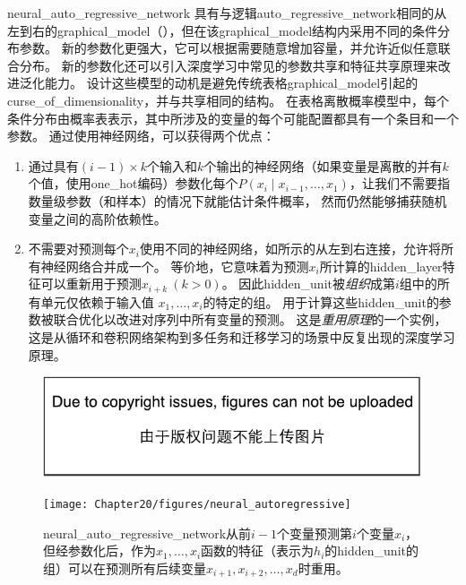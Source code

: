 \gls{neural_auto_regressive_network} \citep{Bengio+Bengio-trnn2000,Bengio+Bengio-NIPS2000}具有与逻辑\gls{auto_regressive_network}相同的从左到右的\gls{graphical_model}（），但在该\gls{graphical_model}结构内采用不同的条件分布参数。
新的参数化更强大，它可以根据需要随意增加容量，并允许近似任意联合分布。
新的参数化还可以引入深度学习中常见的参数共享和特征共享原理来改进泛化能力。
设计这些模型的动机是避免传统表格\gls{graphical_model}引起的\gls{curse_of_dimensionality}，并与共享相同的结构。
在表格离散概率模型中，每个条件分布由概率表表示，其中所涉及的变量的每个可能配置都具有一个条目和一个参数。
通过使用神经网络，可以获得两个优点：
\begin{enumerate}
 \item 通过具有$(i-1) \times k$个输入和$k$个输出的神经网络（如果变量是离散的并有$k$个值，使用\gls{one_hot}编码）参数化每个$P(x_i  \mid  x_{i-1}, \dots, x_1)$，让我们不需要指数量级参数（和样本）的情况下就能估计条件概率， 然而仍然能够捕获随机变量之间的高阶依赖性。

 \item 不需要对预测每个$x_i$使用不同的神经网络，如所示的从左到右连接，允许将所有神经网络合并成一个。
 等价地，它意味着为预测$x_i$所计算的\gls{hidden_layer}特征可以重新用于预测$x_{i+k}~(k > 0)$。
 因此\gls{hidden_unit}被\emph{组织}成第$i$组中的所有单元仅依赖于输入值 $x_1, \dots, x_i$的特定的组。
 用于计算这些\gls{hidden_unit}的参数被联合优化以改进对序列中所有变量的预测。
 这是\emph{重用原理}的一个实例，这是从循环和卷积网络架构到多任务和迁移学习的场景中反复出现的深度学习原理。

\end{enumerate}

\begin{figure}[!htb]
\ifOpenSource
\centerline{\includegraphics{figure.pdf}}
\else
\centerline{\texttt{[image: Chapter20/figures/neural\_autoregressive]}}
\fi
\caption{\gls{neural_auto_regressive_network}从前$i-1$个变量预测第$i$个变量$x_i$，但经参数化后，作为$x_1,\dots,x_i$函数的特征（表示为$h_i$的\gls{hidden_unit}的组）可以在预测所有后续变量$x_{i+1},x_{i+2},\dots,x_{d}$时重用。
}
\label{fig:chap20_neural_autoregressive}
\end{figure}


